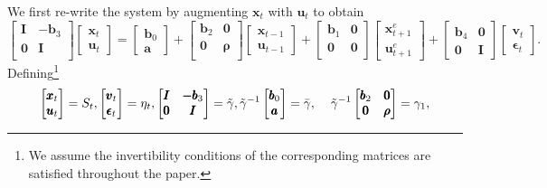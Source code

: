 We first re-write the system by augmenting $ \pmb{x}_t $  with $ \pmb{u}_t $ to obtain
\begin{equation}
 \begin{bmatrix}   \pmb{I} & \pmb{-b}_3 \\ \pmb{0} & \pmb{I} \\     \end{bmatrix}  \begin{bmatrix} \pmb{x}_t \\ \pmb{u}_t \end{bmatrix} = \begin{bmatrix}  \pmb{b}_0 \\ \pmb{a} \end{bmatrix}+ \begin{bmatrix} \pmb{b}_2 & \pmb{0} \\ \pmb{0} & \pmb{\rho} \\ \end{bmatrix} \begin{bmatrix} \pmb{x}_{t-1} \\ \pmb{u}_{t-1} \end{bmatrix}+ \begin{bmatrix} \pmb{b}_1 & \pmb{0} \\ \pmb{0} & \pmb{0} \\ \end{bmatrix} \begin{bmatrix} \pmb{x}_{t+1}^e \\ \pmb{u}_{t+1}^e \end{bmatrix}  + \begin{bmatrix} \pmb{b}_4 & \pmb{0} \\ \pmb{0} & \pmb{I} \end{bmatrix} \begin{bmatrix} \pmb{v}_t \\ \pmb{\epsilon}_t \end{bmatrix}.
\label{eqn:2_6}
\end{equation}
\noindent
Defining\footnote{We assume the invertibility conditions of the corresponding matrices are satisfied throughout the paper.}
$$ \begin{bmatrix} \pmb{x}_t \\ \pmb{u}_t \end{bmatrix} = S_t,  
\begin{bmatrix} \pmb{v}_t \\ \pmb{\epsilon}_t \end{bmatrix} = \eta_t,  
\begin{bmatrix}   \pmb{I} & \pmb{-b}_3 \\ \pmb{0} & \pmb{I} \\     \end{bmatrix}= \tilde{\gamma},
\tilde{\gamma}^{-1} \begin{bmatrix}  \pmb{b}_0 \\ \pmb{a} \end{bmatrix} = \bar{\gamma}, \hspace{2 mm}
 \hspace{2 mm}
\tilde{\gamma}^{-1}\begin{bmatrix} \pmb{b}_2 & \pmb{0} \\ \pmb{0} & \pmb{\rho} \\ \end{bmatrix} = \gamma_1,$$
